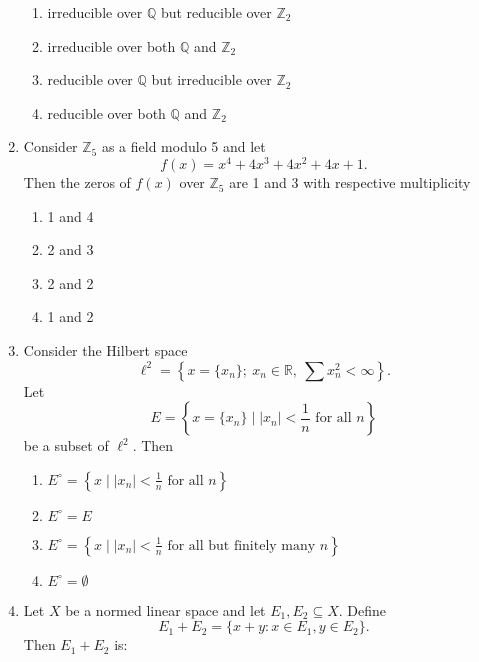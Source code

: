 \documentclass[journal]{IEEEtran}
\numberwithin{equation}{enumi}
\numberwithin{figure}{enumi}
\begin{document}
\begin{enumerate}
\begin{enumerate}
       \item irreducible over $\mathbb{Q}$ but reducible over $\mathbb{Z}_2$
        \item irreducible over both $\mathbb{Q}$ and $\mathbb{Z}_2$
        \item reducible over $\mathbb{Q}$ but irreducible over $\mathbb{Z}_2$
        \item reducible over both $\mathbb{Q}$ and $\mathbb{Z}_2$
    \end{enumerate}
 

\item Consider $\mathbb{Z}_5$ as a field modulo 5 and let   \hfill{}  
    \[
    f(x) = x^4 + 4x^3 + 4x^2 + 4x + 1.
    \]
    Then the zeros of $f(x)$ over $\mathbb{Z}_5$ are 1 and 3 with respective multiplicity
\begin{multicols}{4}
\begin{enumerate}
    \item 1 and 4
    \item 2 and 3 
    \item 2 and 2
    \item  1 and 2
\end{enumerate}
\end{multicols}
    
 
\item Consider the Hilbert space   \hfill{}  
    \[
    \ell^2 = \left\{ x = \{x_n\};\ x_n \in \mathbb{R},\ \sum x_n^2 < \infty \right\}.
    \]
    Let
    \[
    E = \left\{ x = \{x_n\} \mid |x_n| < \frac{1}{n} \text{ for all } n \right\}
    \]
    be a subset of $\ell^2$. Then
    
    \begin{enumerate}
        
        \item $E^\circ = \left\{ x \mid |x_n| < \frac{1}{n} \text{ for all } n \right\}$
        \item $E^\circ = E$
        \item $E^\circ = \left\{ x \mid |x_n| < \frac{1}{n} \text{ for all but finitely many } n \right\}$
        \item $E^\circ = \emptyset$
    \end{enumerate}
    

   
\item Let $X$ be a normed linear space and let $E_1, E_2 \subseteq X$. Define
    \[
    E_1 + E_2 = \{x + y : x \in E_1, y \in E_2\}.
    \]
    Then $E_1 + E_2$ is:      \hfill{}
   

\end{enumerate}
\end{document}
